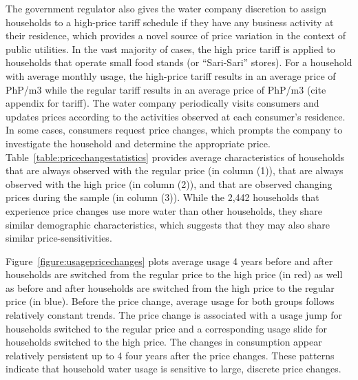 \documentclass[12pt,table]{article}
\begin{document}
The government regulator also gives the water company discretion to assign households to a high-price tariff schedule if they have any business activity at their residence, which provides a novel source of price variation in the context of public utilities.  In the vast majority of cases, the high price tariff is applied to households that operate small food stands (or ``Sari-Sari'' stores).  For a household with average monthly usage, the high-price tariff results in an average price of PhP/m3 while the regular tariff results in an average price of PhP/m3 (cite appendix for tariff).  The water company periodically visits consumers and updates prices according to the activities observed at each consumer's residence.  In some cases, consumers request price changes, which prompts the company to investigate the household and determine the appropriate price.  Table~\ref{table:pricechangestatistics} provides average characteristics of households that are always observed with the regular price (in column (1)), that are always observed with the high price (in column (2)), and that are observed changing prices during the sample (in column (3)).  While the 2,442 households that experience price changes use more water than other households, they share similar demographic characteristics, which suggests that they may also share similar price-sensitivities.  

Figure~\ref{figure:usagepricechanges} plots average usage 4 years before and after households are switched from the regular price to the high price (in red) as well as before and after households are switched from the high price to the regular price (in blue).  Before the price change, average usage for both groups follows relatively constant trends.  The price change is associated with a usage jump for households switched to the regular price and a corresponding usage slide for households switched to the high price.  The changes in consumption appear relatively persistent up to 4 four years after the price changes.  These patterns indicate that household water usage is sensitive to large, discrete price changes.  
\end{document}
